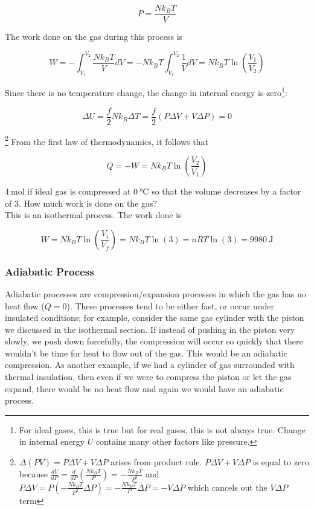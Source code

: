 $$P=\frac{Nk_BT}{V}$$

The work done on the gas during this process is

$$W=-\int_{V_1}^{V_2} \frac{Nk_BT}{V} dV = -Nk_BT \int_{V_1}^{V_2}\frac{1}{V}dV = Nk_BT\ln\left( \frac{V_1}{V_2} \right)$$

Since there is no temperature change, the change in internal energy is zero\footnote{For ideal gases, this is true but for real gases, this is not always true. Change in internal energy $U$ contains many other factors like pressure.}:

$$\Delta U = \frac{f}{2}Nk_B\Delta T = \frac{f}{2} (P \Delta V + V\Delta P) = 0$$

\footnote{$\Delta(PV)=P \Delta V + V\Delta P$ arises from product rule. $P \Delta V + V\Delta P$ is equal to zero because $\frac{dV}{dP}=\frac{d}{dP}\left( \frac{Nk_BT}{P} \right)=-\frac{Nk_BT}{P^2}$ and $P\Delta V=P\left(-\frac{Nk_BT}{P^2}\Delta P\right)=-\frac{Nk_BT}{P}\Delta P=-V\Delta P$ which cancels out the $V\Delta P$ term} From the first law of thermodynamics, it follows that

$$Q=-W=Nk_BT\ln\left( \frac{V_2}{V_1} \right)$$

\begin{texample}
	$\SI{4}{\mole}$ if ideal gas is compressed at $\SI{0}{\celsius}$ so that the volume decreases by a factor of $3$. How much work is done on the gas? \\
	
	This is an isothermal process. The work done is
	
	$$W=Nk_BT\ln\left( \frac{V_i}{V_f} \right)=Nk_BT\ln\left( 3 \right)=nRT\ln(3)=\SI{9980}{\joule}$$
\end{texample}

\subsubsection{Adiabatic Process}

Adiabatic processes are compression/expansion processes in which the gas has no heat flow ($Q=0$). These processes tend to be either fast, or occur under insulated conditions; for example, consider the same gas cylinder with the piston we discussed in the isothermal section. If instead of pushing in the piston very slowly, we push down forcefully, the compression will occur so quickly that there wouldn't be time for heat to flow out of the gas. This would be an adiabatic compression. As another example, if we had a cylinder of gas surrounded with thermal insulation, then even if we were to compress the piston or let the gas expand, there would be no heat flow and again we would have an adiabatic process. \\

